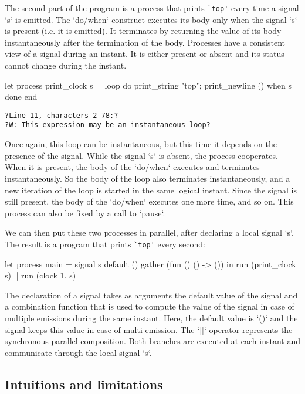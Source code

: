 \documentclass[9pt,preprint]{sigplanconf}
\begin{document}
The second part of the program is a process that prints \verb+`top'+ every time a signal `s` is emitted. 
The `do/when` construct executes its body only when the signal `s` is present (i.e. it is emitted). It terminates by returning the value of its body instantaneously after the termination of the body. Processes have a consistent view of a signal during an instant. It is either present or absent and its status cannot change during the instant.
%
\begin{rmlcl}[10]
let process print_clock s =
  loop
    do
      print_string "top"; print_newline ()
    when s done
  end
\end{rmlcl}
\begin{lstlisting}
?Line 11, characters 2-78:?
?W: This expression may be an instantaneous loop?
\end{lstlisting}
%
Once again, this loop can be instantaneous, but this time it depends on the presence of the signal. While the signal `s` is absent, the process cooperates. When it is present, the body of the `do/when` executes and terminates instantaneously. So the body of the loop also terminates instantaneously, and a new iteration of the loop is started in the same logical instant. Since the signal is still present, the body of the `do/when` executes one more time, and so on. This process can also be fixed by a call to `pause`.

We can then put these two processes in parallel, after declaring a local signal `s`. The result is a program that prints \verb+`top'+ every second:
\begin{rmlcl}[18]
let process main =
  signal s default () gather (fun () () -> ()) in
  run (print_clock s) || run (clock 1. s)
\end{rmlcl}
The declaration of a signal takes as arguments the default value of the signal and a combination function that is used to compute the value of the signal in case of multiple emissions during the same instant. Here, the default value is `()` and the signal keeps this value in case of multi-emission. The `||` operator represents the synchronous parallel composition. Both branches are executed at each instant and communicate through the local signal `s`.

\subsection{Intuitions and limitations}
\label{sec:intuition}


\end{document}
